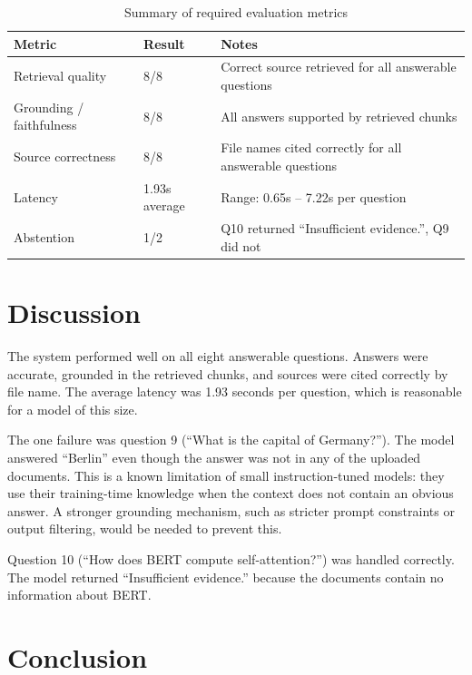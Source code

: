 \documentclass[11pt,a4paper]{article}
\begin{document}
\begin{table}[H]
\centering
\caption{Summary of required evaluation metrics}
\label{tab:metrics}
\begin{tabular}{lll}
\toprule
\textbf{Metric}              & \textbf{Result}         & \textbf{Notes} \\
\midrule
Retrieval quality            & 8/8                     & Correct source retrieved for all answerable questions \\
Grounding / faithfulness     & 8/8                     & All answers supported by retrieved chunks \\
Source correctness           & 8/8                     & File names cited correctly for all answerable questions \\
Latency                      & 1.93s average           & Range: 0.65s -- 7.22s per question \\
Abstention                   & 1/2                     & Q10 returned ``Insufficient evidence.'', Q9 did not \\
\bottomrule
\end{tabular}
\end{table}

\section{Discussion}

The system performed well on all eight answerable questions. Answers were accurate, grounded in the retrieved chunks, and sources were cited correctly by file name. The average latency was 1.93 seconds per question, which is reasonable for a model of this size.

The one failure was question 9 (``What is the capital of Germany?''). The model answered ``Berlin'' even though the answer was not in any of the uploaded documents. This is a known limitation of small instruction-tuned models: they use their training-time knowledge when the context does not contain an obvious answer. A stronger grounding mechanism, such as stricter prompt constraints or output filtering, would be needed to prevent this.

Question 10 (``How does BERT compute self-attention?'') was handled correctly. The model returned ``Insufficient evidence.'' because the documents contain no information about BERT.

\section{Conclusion}
\end{document}
